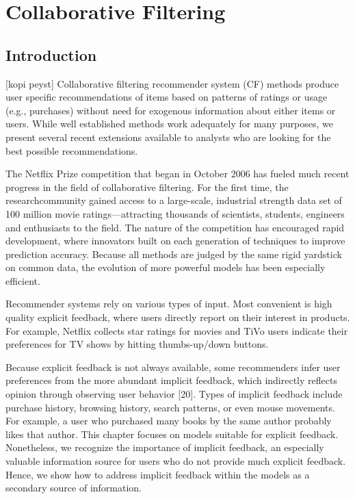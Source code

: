 
\section{Collaborative Filtering}\label{section:collaborative_filtering}

\subsection{Introduction}
[kopi peyst]
Collaborative filtering recommender system (CF) methods produce user specific recommendations of items based on patterns of ratings or usage (e.g., purchases) without need for exogenous information about either items or users. While well established methods work adequately for many purposes, we present several recent extensions available to analysts who are looking for the best possible recommendations.

The Netflix Prize competition that began in October 2006 has fueled much recent progress in the field of collaborative filtering. For the first time, the researchcommunity gained access to a large-scale, industrial strength data set of 100 million movie ratings—attracting thousands of scientists, students, engineers and enthusiasts to the field. The nature of the competition has encouraged rapid development, where innovators built on each generation of techniques to improve prediction accuracy. Because all methods are judged by the same rigid yardstick on common data, the evolution of more powerful models has been especially efficient.

Recommender systems rely on various types of input. Most convenient is high quality explicit feedback, where users directly report on their interest in products. For example, Netflix collects star ratings for movies and TiVo users indicate their preferences for TV shows by hitting thumbs-up/down buttons.

Because explicit feedback is not always available, some recommenders infer user preferences from the more abundant implicit feedback, which indirectly reflects opinion through observing user behavior [20]. Types of implicit feedback include purchase history, browsing history, search patterns, or even mouse movements. For example, a user who purchased many books by the same author probably likes that author. This chapter focuses on models suitable for explicit feedback. Nonetheless, we recognize the importance of implicit feedback, an especially valuable information source for users who do not provide much explicit feedback. Hence, we show how to address implicit feedback within the models as a secondary source of information.

